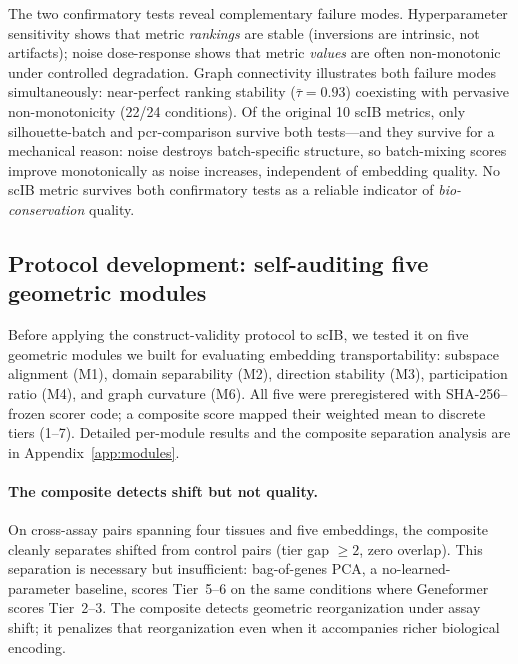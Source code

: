 \documentclass[10pt,letterpaper]{article}
\begin{document}
The two confirmatory tests reveal complementary failure modes. Hyperparameter sensitivity shows that metric \emph{rankings} are stable (inversions are intrinsic, not artifacts); noise dose-response shows that metric \emph{values} are often non-monotonic under controlled degradation. Graph connectivity illustrates both failure modes simultaneously: near-perfect ranking stability ($\bar{\tau} = 0.93$) coexisting with pervasive non-monotonicity (22/24 conditions). Of the original 10 scIB metrics, only silhouette-batch and pcr-comparison survive both tests---and they survive for a mechanical reason: noise destroys batch-specific structure, so batch-mixing scores improve monotonically as noise increases, independent of embedding quality. No scIB metric survives both confirmatory tests as a reliable indicator of \emph{bio-conservation} quality.


\subsection{Protocol development: self-auditing five geometric modules}
\label{sec:modules}

Before applying the construct-validity protocol to scIB, we tested it on five geometric modules we built for evaluating embedding transportability: subspace alignment (M1), domain separability (M2), direction stability (M3), participation ratio (M4), and graph curvature (M6). All five were preregistered with SHA-256--frozen scorer code; a composite score mapped their weighted mean to discrete tiers (1--7). Detailed per-module results and the composite separation analysis are in Appendix~\ref{app:modules}.

\paragraph{The composite detects shift but not quality.} On cross-assay pairs spanning four tissues and five embeddings, the composite cleanly separates shifted from control pairs (tier gap $\geq 2$, zero overlap). This separation is necessary but insufficient: bag-of-genes PCA, a no-learned-parameter baseline, scores Tier~5--6 on the same conditions where Geneformer scores Tier~2--3. The composite detects geometric reorganization under assay shift; it penalizes that reorganization even when it accompanies richer biological encoding.
\end{document}
